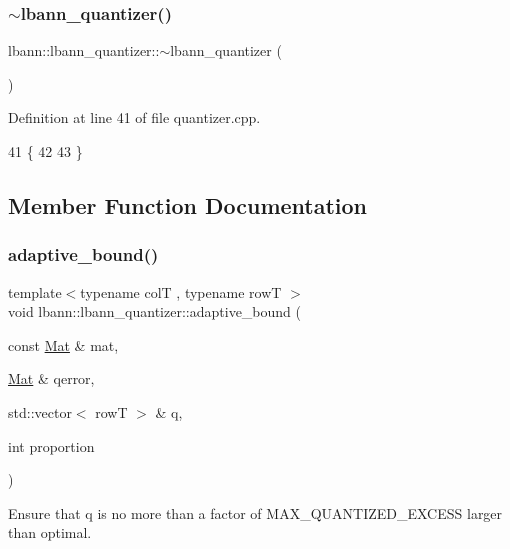 \subsubsection{\texorpdfstring{$\sim$lbann\+\_\+quantizer()}{~lbann\_quantizer()}}
{\footnotesize\ttfamily lbann\+::lbann\+\_\+quantizer\+::$\sim$lbann\+\_\+quantizer (\begin{DoxyParamCaption}{ }\end{DoxyParamCaption})}



Definition at line 41 of file quantizer.\+cpp.


\begin{DoxyCode}
41                                   \{
42 
43 \}
\end{DoxyCode}


\subsection{Member Function Documentation}
\mbox{\label{classlbann_1_1lbann__quantizer_a9d6e80bd54d6eb03dc63c15861356557}} 
\subsubsection{\texorpdfstring{adaptive\+\_\+bound()}{adaptive\_bound()}}
{\footnotesize\ttfamily template$<$typename colT , typename rowT $>$ \\
void lbann\+::lbann\+\_\+quantizer\+::adaptive\+\_\+bound (\begin{DoxyParamCaption}\item[{const \hyperlink{base_8hpp_a68f11fdc31b62516cb310831bbe54d73}{Mat} \&}]{mat,  }\item[{\hyperlink{base_8hpp_a68f11fdc31b62516cb310831bbe54d73}{Mat} \&}]{qerror,  }\item[{std\+::vector$<$ rowT $>$ \&}]{q,  }\item[{int}]{proportion }\end{DoxyParamCaption})\hspace{0.3cm}{\ttfamily [private]}}

Ensure that q is no more than a factor of M\+A\+X\+\_\+\+Q\+U\+A\+N\+T\+I\+Z\+E\+D\+\_\+\+E\+X\+C\+E\+SS larger than optimal. 

